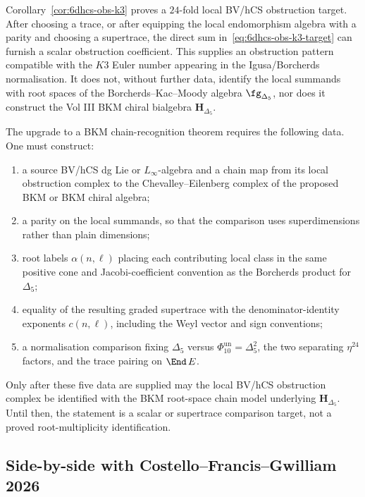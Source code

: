 \begin{remark}
\label{rem:6dhcs-bkm-link}
Corollary~\ref{cor:6dhcs-obs-k3} proves a $24$-fold local
BV/hCS obstruction target. After choosing a trace, or after equipping
the local endomorphism algebra with a parity and choosing a supertrace,
the direct sum in~\eqref{eq:6dhcs-obs-k3-target} can furnish a scalar
obstruction coefficient. This supplies an obstruction pattern compatible
with the \(K3\) Euler number appearing in the Igusa/Borcherds
normalisation. It does not, without further data, identify the local
summands with root spaces of the Borcherds--Kac--Moody algebra
\(\fg_{\Delta_5}\), nor does it construct the Vol III BKM chiral
bialgebra \(\mathbf{H}_{\Delta_5}\).

The upgrade to a BKM chain-recognition theorem requires the following
data. One must construct:
\begin{enumerate}[leftmargin=1.8em]
\item a source BV/hCS dg Lie or \(L_\infty\)-algebra and a chain map
from its local obstruction complex to the Chevalley--Eilenberg complex
of the proposed BKM or BKM chiral algebra;
\item a parity on the local summands, so that the comparison uses
superdimensions rather than plain dimensions;
\item root labels \(\alpha(n,\ell)\) placing each contributing local
class in the same positive cone and Jacobi-coefficient convention as
the Borcherds product for \(\Delta_5\);
\item equality of the resulting graded supertrace with the
denominator-identity exponents \(c(n,\ell)\), including the Weyl vector
and sign conventions;
\item a normalisation comparison fixing \(\Delta_5\) versus
\(\Phi_{10}^{\mathrm{un}}=\Delta_5^2\), the two separating \(\eta^{24}\) factors, and
the trace pairing on \(\End\,E\).
\end{enumerate}
Only after these five data are supplied may the local BV/hCS obstruction
complex be identified with the BKM root-space chain model underlying
\(\mathbf{H}_{\Delta_5}\). Until then, the statement is a scalar or
supertrace comparison target, not a proved root-multiplicity
identification.
\end{remark}

\subsection{Side-by-side with Costello--Francis--Gwilliam 2026}
\label{subsec:vol2-bvbrst-6dhcs-cfg}

